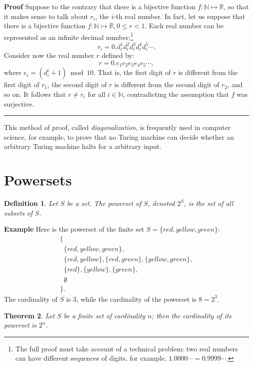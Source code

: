 \documentclass[12pt,a4paper]{article}
\newtheorem{theorem}{Theorem}
\newtheorem{definition}[theorem]{Definition}
\newcommand*{\qed}{\hfill\rule[-2pt]{4pt}{10pt}}
\newenvironment{example}{\textbf{Example}}{}
\newenvironment{proof}{\textbf{Proof}}{\qed}
\begin{document}
\begin{proof}
Suppose to the contrary that there is a bijective function
$f:\mathbb{N}\mapsto \mathbb{R}$, so that it makes sense to talk about
$r_i$, the $i$-th real number. In fact, let us suppose that there is a bijective function $f:\mathbb{N}\mapsto \mathbb{R}, 0\leq r<1$. Each real number can be represented as an infinite decimal number:\footnote{The full proof must take account of a technical problem: two real numbers can have different sequences of digits, for example, $1.0000\cdots =0.9999\cdots$.}
\begin{displaymath}
r_i = 0.d_i^1 d_i^2 d_i^3 d_i^4 d_i^5 \cdots. 
\end{displaymath}
Consider now the real number $r$ defined by:
\begin{displaymath}
r = 0.e_1 e_2 e_3 e_4 e_5 \cdots, 
\end{displaymath}
where $e_i = (d_i^i + 1) \bmod 10$. That is, the first digit of $r$ is
different from the first digit of $r_1$, the second digit of $r$ is
different from the second digit of $r_2$, and so on. It follows that
$r\neq r_i$ for all $i\in \mathbb{N}$, contradicting the assumption
that $f$ was surjective. 
\end{proof}

This method of proof, called \emph{diagonalization}, is frequently used in computer science, for example, to prove that no Turing machine can decide whether an arbitrary Turing machine halts for a arbitrary input.

\newpage

\section{Powersets}

\begin{definition}
Let $S$ be a set. The \emph{powerset} of $S$, denoted $2^S$, is the set of all subsets of $S$.
\end{definition}

\begin{example} Here is the powerset of the finite set
$S=\{\mathit{red}, \mathit{yellow}, \mathit{green}\}$:
\begin{displaymath}
\begin{array}{l}
\{\\
\;\;\{\mathit{red}, \mathit{yellow}, \mathit{green}\},\\
\;\;\{\mathit{red}, \mathit{yellow}\}, \{\mathit{red}, \mathit{green}\},
\{\mathit{yellow}, \mathit{green}\},\\ 
\;\;\{\mathit{red}\}, \{\mathit{yellow}\}, \{\mathit{green}\},\\
\;\;\emptyset\\
\}.
\end{array}
\end{displaymath}
The cardinality of $S$ is $3$, while the cardinality of the powerset
is $8=2^3$.
\end{example}
\begin{theorem}
Let $S$ be a finite set of cardinality $n$;
then the cardinality of its powerset is $2^{n}$.
\end{theorem}
\end{document}
